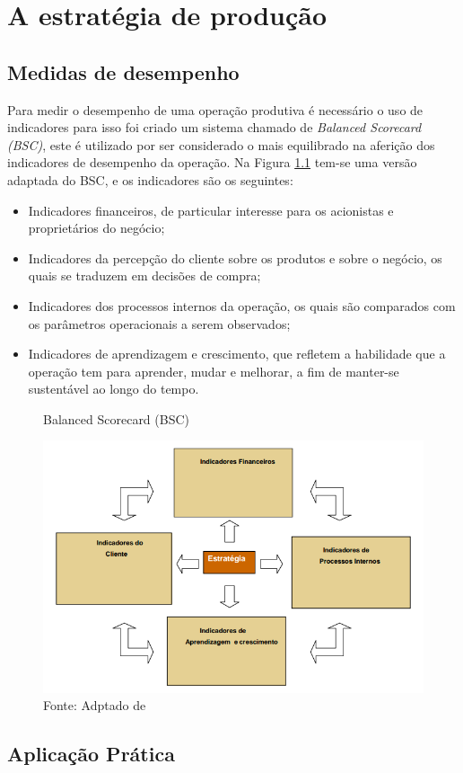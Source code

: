 \chapter{A estratégia de produção} 
\label{chap:estrategia_da_producao} 

\section{Medidas de desempenho} 
\label{sec:estrategia_da_producao_desempenho} 
Para medir o desempenho de uma operação produtiva é necessário o uso de indicadores para isso foi criado um sistema chamado de \textit{Balanced Scorecard (BSC)}, este é utilizado por ser considerado o mais equilibrado na aferição dos indicadores de desempenho da operação.
Na Figura \ref{fig:balanced_scorecard} tem-se uma versão adaptada do BSC, e os indicadores são os seguintes:

\begin{itemize}
    \item Indicadores financeiros, de particular interesse para os acionistas e proprietários do negócio;
    \item Indicadores da percepção do cliente sobre os produtos e sobre o negócio, os quais se traduzem em decisões de compra;
    \item Indicadores dos processos internos da operação, os quais são comparados com os parâmetros operacionais a serem observados;
    \item Indicadores de aprendizagem e crescimento, que refletem a habilidade que a operação tem para aprender, mudar e melhorar, a fim de manter-se sustentável ao longo do tempo.
   
\end{itemize}






\begin{figure}[H]
    \caption{Balanced Scorecard (BSC)}
    \includegraphics[width =\textwidth]{images/bsc.png}
    \caption*{Fonte: Adptado de \cite{kaplan1996using}}
    \label{fig:balanced_scorecard}
\end{figure}
  

\section{Aplicação Prática} 
\label{sec:estrategia_da_producao_aplicacao}